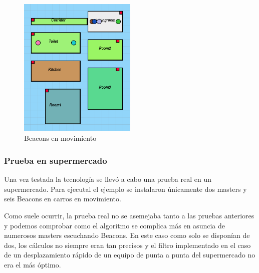 \documentclass[paper=a4, fontsize=11pt,twoside]{scrartcl}
\begin{document}
            \begin{center}
                \begin{figure}[]
                    \centering
                    \includegraphics[width=0.5\textwidth]{../../Memmory/images/house_simulation_3.PNG}
                    \caption{Beacons en movimiento}
                    \label{fig:mesh18}
                \end{figure}
            \end{center}   
        \subsubsection{Prueba en supermercado}
        Una vez testada la tecnología se llevó a cabo una prueba real en un supermercado. Para ejecutal el ejemplo
        se instalaron únicamente dos masters y seis Beacons en carros en movimiento.
        
        Como suele ocurrir, la prueba real no se asemejaba tanto a las pruebas anteriores y podemos comprobar como 
        el algoritmo se complica más en asuncia de numerosos masters escuchando Beacons. En este caso como solo se disponían
        de dos, los cálculos no siempre eran tan precisos y el filtro implementado en el caso de un desplazamiento rápido de un 
        equipo de punta a punta del supermercado no era el más óptimo.
        
\end{document}
